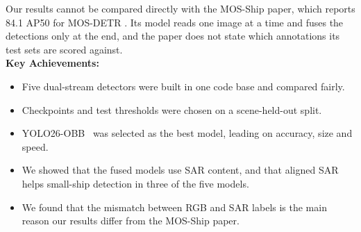 Our results cannot be compared directly with the MOS-Ship paper, which reports 84.1 AP50 for MOS-DETR \cite{you2026multi}. Its model reads one image at a time and fuses the detections only at the end, and the paper does not state which annotations its test sets are scored against.\\

\noindent\textbf{Key Achievements:}
\begin{itemize}
    \item Five dual-stream detectors were built in one code base and compared fairly.
    \item Checkpoints and test thresholds were chosen on a scene-held-out split.
    \item YOLO26-OBB~\cite{jocher2026ultralytics} was selected as the best model, leading on accuracy, size and speed.
    \item We showed that the fused models use SAR content, and that aligned SAR helps small-ship detection in three of the five models.
    \item We found that the mismatch between RGB and SAR labels is the main reason our results differ from the MOS-Ship paper\cite{you2026multi}.
\end{itemize}



